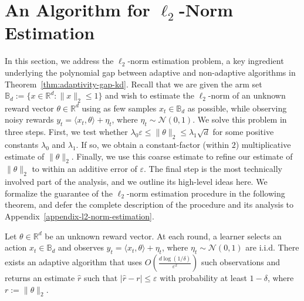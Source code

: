\section{An Algorithm for $\ell_2$-Norm Estimation}\label{sec:norm-estimation}

In this section, we address the $\ell_2$-norm estimation problem, {a key ingredient underlying the polynomial gap between adaptive and non-adaptive algorithms in Theorem~\ref{thm:adaptivity-gap-kd}}. Recall that we are given the arm set $\mathbb{B}_d:=\{x\in\mathbb{R}^d:\|x\|_2\le 1\}$ and wish to estimate the $\ell_2$-norm of an unknown reward vector $\theta\in\mathbb{R}^d$ using as few samples $x_t\in\mathbb{B}_d$ as possible, while observing noisy rewards $y_t=\langle x_t,\theta\rangle+\eta_t$, where $\eta_t\sim\mathcal{N}(0,1)$. We solve this problem in three steps. First, we test whether $\lambda_0\varepsilon \le \|\theta\|_2 \le \lambda_1\sqrt{d}$ for some positive constants $\lambda_0$ and $\lambda_1$. If so, we obtain a constant-factor (within $2$) multiplicative estimate of $\|\theta\|_2$. Finally, we use this coarse estimate to refine our estimate of $\|\theta\|_2$ to within an additive error of $\varepsilon$. The final step is the most technically involved part of the analysis, and we outline its high-level ideas here. We formalize the guarantee of the $\ell_2$-norm estimation procedure in the following theorem, and defer the complete description of the procedure and its analysis to Appendix~\ref{appendix-l2-norm-estimation}.

\begin{theorem}\label{thm:l2-norm-estimation}
Let $\theta\in\mathbb{R}^d$ be an unknown reward vector. At each round, a learner selects an action $x_t\in\mathbb{B}_d$ and observes $y_t=\langle x_t,\theta\rangle+\eta_t$, where $\eta_t\sim\mathcal{N}(0,1)$ are i.i.d.
There exists an adaptive algorithm that uses $O\!\left(\frac{d\log(1/\delta)}{\varepsilon^2}\right)$ such observations and returns an estimate $\widehat{r}$ such that $|\widehat{r}-r|\le \varepsilon$ with probability at least $1-\delta$, where $r:=\|\theta\|_2$.
\end{theorem}




